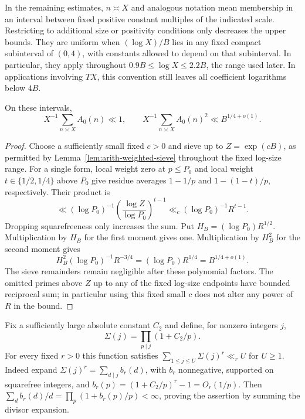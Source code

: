 In the remaining estimates, $n\asymp X$ and analogous notation mean
membership in an interval between fixed positive constant multiples of
the indicated scale.  Restricting to additional size or positivity
conditions only decreases the upper bounds.  They are uniform when
$(\log X)/B$ lies in any fixed compact subinterval of $(0,4)$, with constants
allowed to depend on that subinterval.  In particular, they apply throughout
$0.9B\le\log X\le2.2B$, the range used later.
In applications involving $TX$, this convention still leaves all
coefficient logarithms below $4B$.

\begin{lemma}
\label{lem:arith-coefficient-moments}
On these intervals,
\begin{equation}
 X^{-1}\sum_{n\asymp X}A_0(n)\ll1,\qquad
 X^{-1}\sum_{n\asymp X}A_0(n)^2\ll B^{1/4+o(1)}.
 \label{eq:5}
\end{equation}
\end{lemma}

\begin{proof}
Choose a sufficiently small fixed $c>0$ and sieve up to $Z=\exp(cB)$,
as permitted by Lemma~\ref{lem:arith-weighted-sieve} throughout the fixed
log-size range.  For a single form, local weight zero at $p\le P_0$ and
local weight $t\in\{1/2,1/4\}$ above $P_0$ give residue averages
$1-1/p$ and $1-(1-t)/p$, respectively.  Their product is
\[
 \ll (\log P_0)^{-1}
             \left(\frac{\log Z}{\log P_0}\right)^{t-1}
       \ll_c(\log P_0)^{-1}R^{t-1}.
\]
Dropping squarefreeness only increases the sum.  Put
$H_B=(\log P_0)R^{1/2}$.  Multiplication by $H_B$ for the first moment gives
one.  Multiplication by $H_B^2$ for the second moment gives
\[
 H_B^2(\log P_0)^{-1}R^{-3/4}
       =(\log P_0)R^{1/4}=B^{1/4+o(1)}.
\]
The sieve remainders remain negligible after these polynomial factors.
The omitted primes above $Z$ up to any of the fixed log-size endpoints
have bounded reciprocal sum; in particular using this fixed small $c$
does not alter any power of $R$ in the bound.
\end{proof}

Fix a sufficiently large absolute constant $C_2$ and define, for nonzero
integers $j$,
\[
 \Sigma(j)=\prod_{p\mid j}(1+C_2/p).
\]
For every fixed $r>0$ this function satisfies
$\sum_{1\le j\le U}\Sigma(j)^r\ll_r U$ for $U\ge1$.
Indeed expand $\Sigma(j)^r=\sum_{d\mid j}b_r(d)$, with $b_r$ nonnegative,
supported on squarefree integers, and
$b_r(p)=(1+C_2/p)^r-1=O_r(1/p)$.  Then
$\sum_d b_r(d)/d=\prod_p(1+b_r(p)/p)<\infty$, proving the assertion by
summing the divisor expansion.

